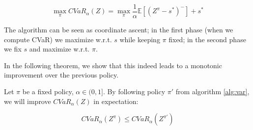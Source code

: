 \begin{equation}
\max_\pi CVaR_\alpha(Z) = \max_\pi \dfrac{1}{\alpha}\mathbb{E}
\left[ (Z^\pi-s^*)^-\right] + s^*
\end{equation}


The algorithm can be seen as coordinate ascent; in the first phase (when we compute CVaR) we maximize w.r.t. $s$ while keeping $\pi$ fixed; in the second phase we fix $s$ and maximize w.r.t. $\pi$.

In the following theorem, we show that this indeed leads to a monotonic improvement over the previous policy.

\begin{theorem}
Let $\pi$ be a fixed policy, $\alpha \in (0, 1]$. By following policy $\pi'$ from algorithm \ref{alg:var}, we will improve $CVaR_\alpha(Z)$ in expectation:

$$CVaR_\alpha(Z^\pi) \le CVaR_\alpha(Z^{\pi'})$$
\end{theorem}

